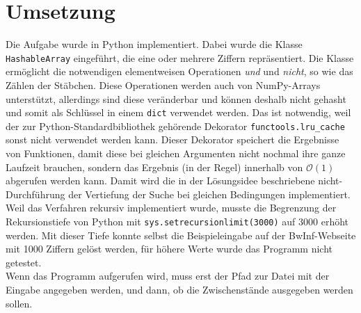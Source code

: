 \documentclass[a4paper,10pt,ngerman]{scrartcl}
\begin{document}
\section{Umsetzung}
Die Aufgabe wurde in Python implementiert. Dabei wurde die Klasse \lstinline|HashableArray| eingeführt, die eine oder mehrere Ziffern repräsentiert. Die Klasse ermöglicht die notwendigen elementweisen Operationen \textit{und} und \textit{nicht}, so wie das Zählen der Stäbchen. Diese Operationen werden auch von NumPy-Arrays unterstützt, allerdings sind diese veränderbar und können deshalb nicht gehasht und somit als Schlüssel in einem \lstinline|dict| verwendet werden. Das ist notwendig, weil der zur Python-Standardbibliothek gehörende Dekorator \lstinline|functools.lru_cache| sonst nicht verwendet werden kann. Dieser Dekorator speichert die Ergebnisse von Funktionen, damit diese bei gleichen Argumenten nicht nochmal ihre ganze Laufzeit brauchen, sondern das Ergebnis (in der Regel) innerhalb von $\mathcal{O}(1)$ abgerufen werden kann. Damit wird die in der Lösungsidee beschriebene nicht-Durchführung der Vertiefung der Suche bei gleichen Bedingungen implementiert. Weil das Verfahren rekursiv implementiert wurde, musste die Begrenzung der Rekursionstiefe von Python mit \lstinline|sys.setrecursionlimit(3000)| auf 3000 erhöht werden. Mit dieser Tiefe konnte selbst die Beispieleingabe auf der BwInf-Webseite mit 1000 Ziffern gelöst werden, für höhere Werte wurde das Programm nicht getestet. \\
Wenn das Programm aufgerufen wird, muss erst der Pfad zur Datei mit der Eingabe angegeben werden, und dann, ob die Zwischenstände ausgegeben werden sollen.
\end{document}
